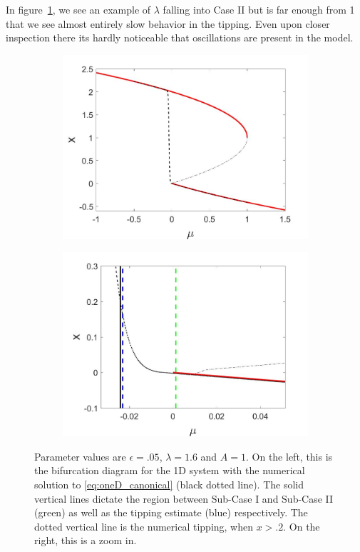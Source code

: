 In figure~\ref{fig:oneD_slowosc_numerical_large}, we see an example of $\lambda$ falling into Case II but is far enough from 1 that we see almost entirely slow behavior in the tipping. Even upon closer inspection there its hardly noticeable that oscillations are present in the model. 

\begin{figure}[H]
\centering
\begin{subfigure}{.5\textwidth}
  \centering
  \includegraphics[width=\linewidth]{oneD/slowosc_bif_diagram_large.jpg}
  \caption{}
\end{subfigure}%
\begin{subfigure}{.5\textwidth}
  \centering
  \includegraphics[width=\linewidth]{oneD/slowosc_bif_diagram_large_zoom.jpg}
  \caption{}
\end{subfigure}
\caption{Parameter values are $\epsilon=.05$, $\lambda=1.6$ and $A=1$. On the left, this is the bifurcation diagram for the 1D system with the numerical solution to \eqref{eq:oneD_canonical} (black dotted line). The solid vertical lines dictate the region between Sub-Case I and Sub-Case II (green) as well as the tipping estimate (blue) respectively. The dotted vertical line is the numerical tipping, when $x>.2$. On the right, this is a zoom in.}
\label{fig:oneD_slowosc_numerical_large}
\end{figure}

